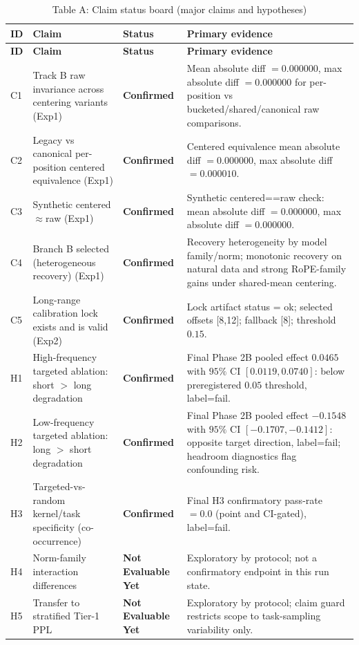 \documentclass[11pt]{article}
\newcommand{\statusConfirmed}{\textbf{Confirmed}}
\newcommand{\statusNotEval}{\textbf{Not Evaluable Yet}}
\begin{document}
\begin{center}
\small
\setlength{\tabcolsep}{3.5pt}
\begin{longtable}{L{0.08\textwidth}L{0.26\textwidth}L{0.16\textwidth}L{0.41\textwidth}}
\caption{Table A: Claim status board (major claims and hypotheses)}\\
\toprule
\textbf{ID} & \textbf{Claim} & \textbf{Status} & \textbf{Primary evidence} \\
\midrule
\endfirsthead
\toprule
\textbf{ID} & \textbf{Claim} & \textbf{Status} & \textbf{Primary evidence} \\
\midrule
\endhead
C1 & Track B raw invariance across centering variants (Exp1) & \statusConfirmed & Mean absolute diff $=0.000000$, max absolute diff $=0.000000$ for per-position vs bucketed/shared/canonical raw comparisons. \\
C2 & Legacy vs canonical per-position centered equivalence (Exp1) & \statusConfirmed & Centered equivalence mean absolute diff $=0.000000$, max absolute diff $=0.000010$. \\
C3 & Synthetic centered$\approx$raw (Exp1) & \statusConfirmed & Synthetic centered==raw check: mean absolute diff $=0.000000$, max absolute diff $=0.000000$. \\
C4 & Branch B selected (heterogeneous recovery) (Exp1) & \statusConfirmed & Recovery heterogeneity by model family/norm; monotonic recovery on natural data and strong RoPE-family gains under shared-mean centering. \\
C5 & Long-range calibration lock exists and is valid (Exp2) & \statusConfirmed & Lock artifact status = ok; selected offsets [8,12]; fallback [8]; threshold $0.15$. \\
H1 & High-frequency targeted ablation: short $>$ long degradation & \statusConfirmed & Final Phase 2B pooled effect \(0.0465\) with \(95\%\) CI \([0.0119, 0.0740]\): below preregistered \(0.05\) threshold, label=fail. \\
H2 & Low-frequency targeted ablation: long $>$ short degradation & \statusConfirmed & Final Phase 2B pooled effect \(-0.1548\) with \(95\%\) CI \([-0.1707,-0.1412]\): opposite target direction, label=fail; headroom diagnostics flag confounding risk. \\
H3 & Targeted-vs-random kernel/task specificity (co-occurrence) & \statusConfirmed & Final H3 confirmatory pass-rate \(=0.0\) (point and CI-gated), label=fail. \\
H4 & Norm-family interaction differences & \statusNotEval & Exploratory by protocol; not a confirmatory endpoint in this run state. \\
H5 & Transfer to stratified Tier-1 PPL & \statusNotEval & Exploratory by protocol; claim guard restricts scope to task-sampling variability only. \\
\bottomrule
\end{longtable}
\setlength{\tabcolsep}{6pt}
\end{center}
\end{document}
